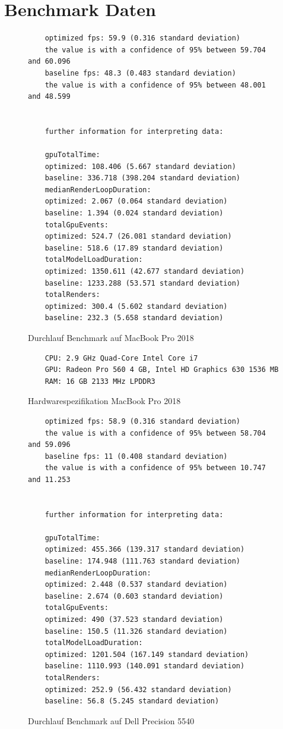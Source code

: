 \section{Benchmark Daten}
\begin{figure}[H]
  \begin{lstlisting}
    optimized fps: 59.9 (0.316 standard deviation)
    the value is with a confidence of 95% between 59.704 and 60.096
    baseline fps: 48.3 (0.483 standard deviation)
    the value is with a confidence of 95% between 48.001 and 48.599


    further information for interpreting data:

    gpuTotalTime:
    optimized: 108.406 (5.667 standard deviation)
    baseline: 336.718 (398.204 standard deviation)
    medianRenderLoopDuration:
    optimized: 2.067 (0.064 standard deviation)
    baseline: 1.394 (0.024 standard deviation)
    totalGpuEvents:
    optimized: 524.7 (26.081 standard deviation)
    baseline: 518.6 (17.89 standard deviation)
    totalModelLoadDuration:
    optimized: 1350.611 (42.677 standard deviation)
    baseline: 1233.288 (53.571 standard deviation)
    totalRenders:
    optimized: 300.4 (5.602 standard deviation)
    baseline: 232.3 (5.658 standard deviation)
  \end{lstlisting}
\caption{Durchlauf Benchmark auf MacBook Pro 2018}
\label{fig:marcbookBenchmarkRun}
\end{figure}

\begin{figure}[H]
  \begin{lstlisting}
    CPU: 2.9 GHz Quad-Core Intel Core i7
    GPU: Radeon Pro 560 4 GB, Intel HD Graphics 630 1536 MB
    RAM: 16 GB 2133 MHz LPDDR3
  \end{lstlisting}
\caption{Hardwarespezifikation MacBook Pro 2018}
\label{fig:marcbookProSpecification}
\end{figure}

\begin{figure}[H]
  \begin{lstlisting}
    optimized fps: 58.9 (0.316 standard deviation)
    the value is with a confidence of 95% between 58.704 and 59.096
    baseline fps: 11 (0.408 standard deviation)
    the value is with a confidence of 95% between 10.747 and 11.253


    further information for interpreting data:

    gpuTotalTime:
    optimized: 455.366 (139.317 standard deviation)
    baseline: 174.948 (111.763 standard deviation)
    medianRenderLoopDuration:
    optimized: 2.448 (0.537 standard deviation)
    baseline: 2.674 (0.603 standard deviation)
    totalGpuEvents:
    optimized: 490 (37.523 standard deviation)
    baseline: 150.5 (11.326 standard deviation)
    totalModelLoadDuration:
    optimized: 1201.504 (167.149 standard deviation)
    baseline: 1110.993 (140.091 standard deviation)
    totalRenders:
    optimized: 252.9 (56.432 standard deviation)
    baseline: 56.8 (5.245 standard deviation)
  \end{lstlisting}
\caption{Durchlauf Benchmark auf Dell Precision 5540}
\label{fig:windowsBenchmarkRun}
\end{figure}

